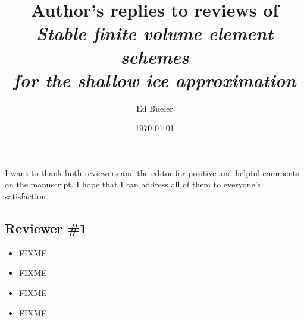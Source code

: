 \documentclass[11pt,reqno]{amsart}
\title[Author's replies to reviews of \emph{Stable finite volume element schemes \dots}]{Author's replies to reviews of \\ \emph{Stable finite volume element schemes} \\ \emph{for the shallow ice approximation}}
\author{Ed Bueler}
\date{\today}
\newcommand{\reply}[2]{
\medskip\medskip
\item  \begin{quote}
\emph{#1}
\end{quote}

\medskip
\noindent #2}
\begin{document}
\maketitle

\thispagestyle{empty}



I want to thank both reviewers and the editor for positive and helpful comments on the manuscript.  I hope that I can address all of them to everyone's satisfaction.


\subsection*{Reviewer \#1}  \begin{itemize}
\reply{}
{FIXME}

\reply{}
{FIXME}

\reply{}
{FIXME}

\reply{}
{FIXME}
\end{itemize}
\end{document}
